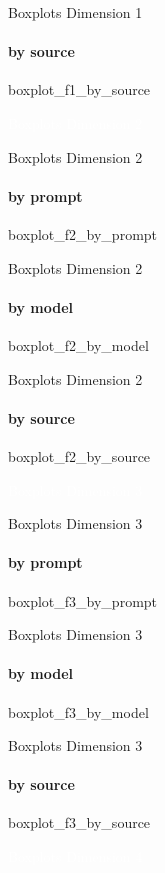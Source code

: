 {\nologo
\begin{frame}{Boxplots Dimension 1}
    \framesubtitle{by source}
    {boxplot_f1_by_source}
\end{frame}
}

{\nologo
{}
\begin{frame}[c,plain]{}
    \vspace*{1cm}
    \centering
    \Huge
    \textcolor{white}{Boxplots Dimension 2}
\end{frame}
}

{\nologo
\begin{frame}{Boxplots Dimension 2}
    \framesubtitle{by prompt}
    {boxplot_f2_by_prompt}
\end{frame}
}

{\nologo
\begin{frame}{Boxplots Dimension 2}
    \framesubtitle{by model}
    {boxplot_f2_by_model}
\end{frame}
}

{\nologo
\begin{frame}{Boxplots Dimension 2}
    \framesubtitle{by source}
    {boxplot_f2_by_source}
\end{frame}
}

{\nologo
{}
\begin{frame}[c,plain]{}
    \vspace*{1cm}
    \centering
    \Huge
    \textcolor{white}{Boxplots Dimension 3}
\end{frame}
}

{\nologo
\begin{frame}{Boxplots Dimension 3}
    \framesubtitle{by prompt}
    {boxplot_f3_by_prompt}
\end{frame}
}

{\nologo
\begin{frame}{Boxplots Dimension 3}
    \framesubtitle{by model}
    {boxplot_f3_by_model}
\end{frame}
}

{\nologo
\begin{frame}{Boxplots Dimension 3}
    \framesubtitle{by source}
    {boxplot_f3_by_source}
\end{frame}
}

{\nologo
{}
\begin{frame}[c,plain]{}
    \vspace*{1cm}
    \centering
    \Huge
    \textcolor{white}{Boxplots Dimension 4}
\end{frame}
}

